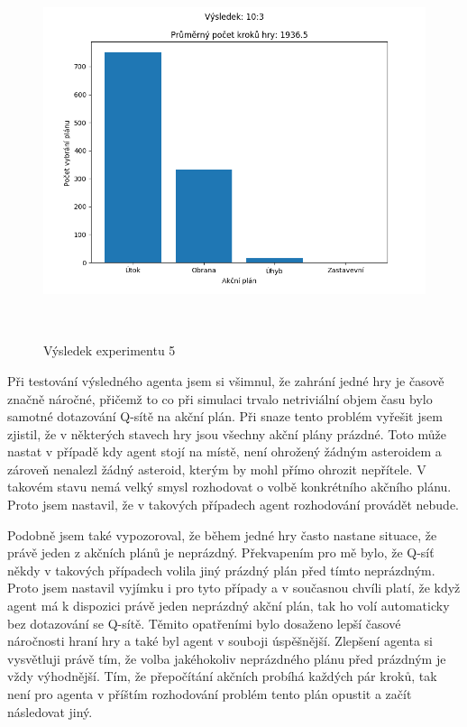 \begin{figure}[H]\centering
    \includegraphics[width=145mm, height=110mm]{./Obrazky/Experiment05Results.png}
    \caption{Výsledek experimentu 5}
    \label{Průběh trénování experimentu 05}
    \end{figure}



Při testování výsledného agenta jsem si všimnul, že zahrání jedné hry je časově značně náročné, přičemž to co při simulaci trvalo netriviální objem času bylo samotné dotazování Q-sítě na akční plán.
Při snaze tento problém vyřešit jsem zjistil, že v některých stavech hry jsou všechny akční plány prázdné. 
Toto může nastat v případě kdy agent stojí na místě, není ohrožený žádným asteroidem a zároveň nenalezl žádný asteroid, kterým by mohl přímo ohrozit nepřítele.
V takovém stavu nemá velký smysl rozhodovat o volbě konkrétního akčního plánu. Proto jsem nastavil, že v takových případech agent rozhodování provádět nebude.

Podobně jsem také vypozoroval, že během jedné hry často nastane situace, že právě jeden z akčních plánů je neprázdný. Překvapením pro mě bylo, že Q-síť někdy v takových případech volila jiný prázdný plán před tímto neprázdným.
Proto jsem nastavil vyjímku i pro tyto případy a v současnou chvíli platí, že když agent má k dispozici právě jeden neprázdný akční plán, tak ho volí automaticky bez dotazování se Q-sítě.
Těmito opatřeními bylo dosaženo lepší časové náročnosti hraní hry a také byl agent v souboji úspěšnější. 
Zlepšení agenta si vysvětluji právě tím, že volba jakéhokoliv neprázdného plánu před prázdným je vždy výhodnější.
Tím, že přepočítání akčních probíhá každých pár kroků, tak není pro agenta v příštím rozhodování problém tento plán opustit a začít následovat jiný.

